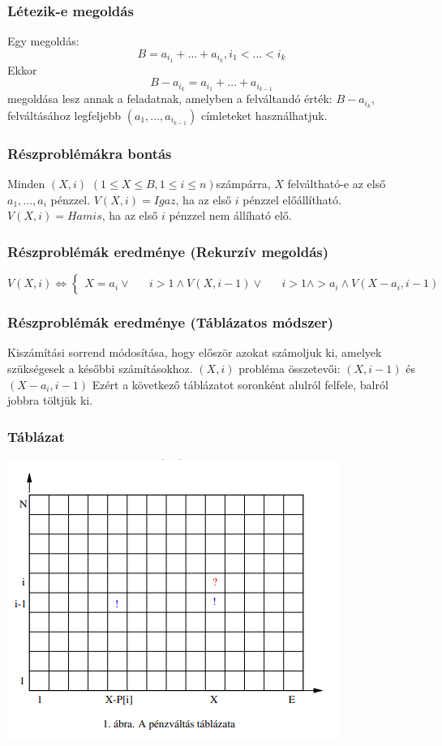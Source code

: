 \documentclass{beamer}
\begin{document}
\begin{frame}
    \frametitle{Létezik-e megoldás}
    Egy megoldás:
    \[B = a_{i_1} + \dots + a_{i_k}, i_1 < ... <i_k\] \newline
    Ekkor 
    \[B-a_{i_k} = a_{i_1} + \dots + a_{i_{k-1}}\]
    megoldása lesz annak a feladatnak, amelyben a felváltandó érték: \(B-a_{i_k}\),
     felváltásához legfeljebb \((a_1,...,a_{i_{k-1}})\) címleteket használhatjuk.
\end{frame}
\begin{frame}
    \frametitle{Részproblémákra bontás}
    Minden \((X,i)\) \((1 \leq X \leq B, 1 \leq i \leq n)\)számpárra,
    \(X\) felváltható-e az első \(a_1,...,a_i\) pénzzel. \newline
    \(V(X,i) = Igaz\), ha az első \(i\) pénzzel előállítható.   \newline
    \(V(X,i) = Hamis\), ha az első \(i\) pénzzel nem állíható elő.
\end{frame}
\begin{frame}
    \frametitle{Részproblémák eredménye (Rekurzív megoldás)}
    \[
        V(X,i) \Leftrightarrow
    \begin{cases}
        X=a_i\vee &&
        i>1\wedge V(X,i-1)\vee&&
        i>1\wedge >a_i\wedge V(X-a_i,i-1)&&
    \end{cases}
    \]
\end{frame}
\begin{frame}
    \frametitle{Részproblémák eredménye (Táblázatos módszer)}
    Kiszámítási sorrend módosítása, hogy először azokat számoljuk ki, amelyek szükségesek
    a későbbi számításokhoz. \newline
    \((X,i)\) probléma összetevői: \((X,i-1)\) és \((X-a_i,i-1)\) \newline
    Ezért a következő táblázatot soronként alulról felfele, balról jobbra töltjük ki.
\end{frame}
\begin{frame}
    \frametitle{Táblázat}
    \centering
    \includegraphics[scale=0.6]{table.png}
\end{frame}
\end{document}
